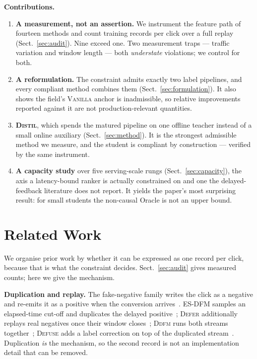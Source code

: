 \documentclass[runningheads]{llncs}
\begin{document}
\smallskip\noindent\textbf{Contributions.}
\begin{enumerate}
\item \textbf{A measurement, not an assertion.} We instrument the feature path of fourteen methods
and count training records per click over a full replay (Sect.~\ref{sec:audit}). Nine exceed one.
Two measurement traps --- traffic variation and window length --- both \emph{understate} violations;
we control for both.
\item \textbf{A reformulation.} The constraint admits exactly two label pipelines, and every
compliant method combines them (Sect.~\ref{sec:formulation}). It also shows the field's
\textsc{Vanilla} anchor is inadmissible, so relative improvements reported against it are not
production-relevant quantities.
\item \textbf{\textsc{Distil}}, which spends the matured pipeline on one offline teacher instead of
a small online auxiliary (Sect.~\ref{sec:method}). It is the strongest admissible method we measure,
and the student is compliant by construction --- verified by the same instrument.
\item \textbf{A capacity study} over five serving-scale rungs (Sect.~\ref{sec:capacity}), the axis a
latency-bound ranker is actually constrained on and one the delayed-feedback literature does not
report. It yields the paper's most surprising result: for small students the non-causal Oracle is
not an upper bound.
\end{enumerate}

\section{Related Work}\label{sec:related}

We organise prior work by whether it can be expressed as one record per click, because that is what
the constraint decides. Sect.~\ref{sec:audit} gives measured counts; here we give the mechanism.

\smallskip\noindent\textbf{Duplication and replay.} The fake-negative family writes the click as a
negative and re-emits it as a positive when the conversion
arrives~\cite{ktena2019addressing}. \textsc{ES-DFM} samples an elapsed-time cut-off and duplicates
the delayed positive~\cite{yang2021capturing}; \textsc{Defer} additionally replays real negatives
once their window closes~\cite{gu2021real}; \textsc{Ddfm} runs both streams
together~\cite{dai2023dually}; \textsc{Defuse} adds a label correction on top of the duplicated
stream~\cite{chen2022asymptotically}. Duplication \emph{is} the mechanism, so the second record is
not an implementation detail that can be removed.
\end{document}
